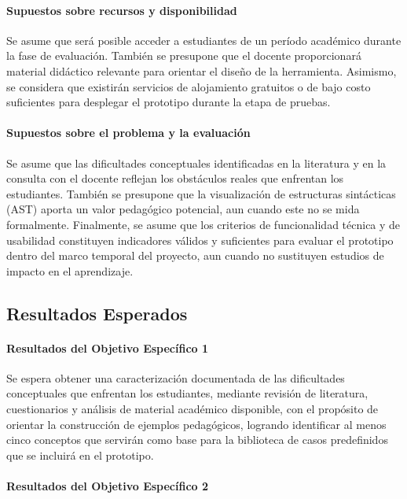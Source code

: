 \paragraph{Supuestos sobre recursos y disponibilidad}

Se asume que será posible acceder a estudiantes de un período académico durante la fase de evaluación. También se presupone que el docente proporcionará material didáctico relevante para orientar el diseño de la herramienta. Asimismo, se considera que existirán servicios de alojamiento gratuitos o de bajo costo suficientes para desplegar el prototipo durante la etapa de pruebas.

\paragraph{Supuestos sobre el problema y la evaluación}

Se asume que las dificultades conceptuales identificadas en la literatura y en la consulta con el docente reflejan los obstáculos reales que enfrentan los estudiantes. También se presupone que la visualización de estructuras sintácticas (AST) aporta un valor pedagógico potencial, aun cuando este no se mida formalmente. Finalmente, se asume que los criterios de funcionalidad técnica y de usabilidad constituyen indicadores válidos y suficientes para evaluar el prototipo dentro del marco temporal del proyecto, aun cuando no sustituyen estudios de impacto en el aprendizaje.

\subsection{Resultados Esperados}

\paragraph{Resultados del Objetivo Específico 1}

Se espera obtener una caracterización documentada de las dificultades conceptuales que enfrentan los estudiantes, mediante revisión de literatura, cuestionarios y análisis de material académico disponible, con el propósito de orientar la construcción de ejemplos pedagógicos, logrando identificar al menos cinco conceptos que servirán como base para la biblioteca de casos predefinidos que se incluirá en el prototipo.

\paragraph{Resultados del Objetivo Específico 2}

